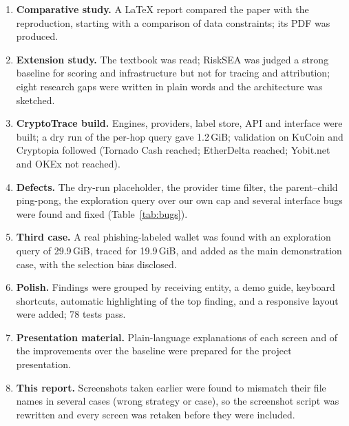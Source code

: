 \begin{enumerate}[label=\arabic*.]
\item \textbf{Comparative study.} A LaTeX report compared the paper with the reproduction, starting with a comparison of data constraints; its PDF was produced.
\item \textbf{Extension study.} The textbook was read; RiskSEA was judged a strong baseline for scoring and infrastructure but not for tracing and attribution; eight research gaps were written in plain words and the architecture was sketched.
\item \textbf{CryptoTrace build.} Engines, providers, label store, API and interface were built; a dry run of the per-hop query gave 1.2\,GiB; validation on KuCoin and Cryptopia followed (Tornado Cash reached; EtherDelta reached; Yobit.net and OKEx not reached).
\item \textbf{Defects.} The dry-run placeholder, the provider time filter, the parent--child ping-pong, the exploration query over our own cap and several interface bugs were found and fixed (Table~\ref{tab:bugs}).
\item \textbf{Third case.} A real phishing-labeled wallet was found with an exploration query of 29.9\,GiB, traced for 19.9\,GiB, and added as the main demonstration case, with the selection bias disclosed.
\item \textbf{Polish.} Findings were grouped by receiving entity, a demo guide, keyboard shortcuts, automatic highlighting of the top finding, and a responsive layout were added; 78 tests pass.
\item \textbf{Presentation material.} Plain-language explanations of each screen and of the improvements over the baseline were prepared for the project presentation.
\item \textbf{This report.} Screenshots taken earlier were found to mismatch their file names in several cases (wrong strategy or case), so the screenshot script was rewritten and every screen was retaken before they were included.
\end{enumerate}
